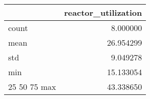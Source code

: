 \begin{tabular}{lr}
\toprule
 & reactor\_utilization \\
\midrule
count & 8.000000 \\
mean & 26.954299 \\
std & 9.049278 \\
min & 15.133054 \\
25%
50%
75%
max & 43.338650 \\
\bottomrule
\end{tabular}

